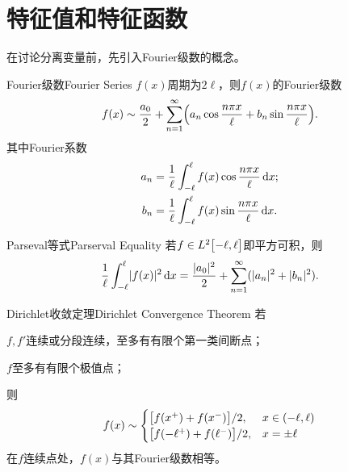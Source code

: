 \section{特征值和特征函数}
在讨论分离变量前，先引入Fourier级数的概念。
\begin{definition}{Fourier级数}{Fourier Series}
	$f(x)$周期为$2\ell$，则$f(x)$的Fourier级数
	\begin{align}
		f(x) \sim \frac{a_0}2 + \sum_{n=1}^\infty\Bigl(a_n\cos\frac{n\pi x}\ell + b_n\sin\frac{n\pi x}\ell\Bigr).
	\end{align}
	其中Fourier系数
	\begin{subequations}
		\label{eq:mmp-fourier-coefficients}
		\begin{align}
			a_n & = \frac1\ell\int_{-\ell}^\ell f(x)\cos\frac{n\pi x}\ell\mathop{}\!\mathrm{d} x; \\
			b_n & = \frac1\ell\int_{-\ell}^\ell f(x)\sin\frac{n\pi x}\ell\mathop{}\!\mathrm{d} x.
		\end{align}
	\end{subequations}
\end{definition}
\begin{theorem}{Parseval等式}{Parserval Equality}
	若$f \in L^2\bigl[-\ell,\ell\bigr]$即平方可积，则
	\begin{equation}
		\label{eq:mmp-trigonometric-parseval}
		\frac1\ell\int_{-\ell}^\ell \lvert f(x)\rvert^2\mathop{}\!\mathrm{d} x = \frac{\lvert a_0\rvert^2}2 + \sum_{n=1}^\infty(\lvert a_n\rvert^2 + \lvert b_n\rvert^2).
	\end{equation}
\end{theorem}
\begin{theorem}{Dirichlet收敛定理}{Dirichlet Convergence Theorem}
	若
	\begin{compactenum}
		\item $f,f'$连续或分段连续，至多有有限个第一类间断点；%
		\item $f$至多有有限个极值点；
	\end{compactenum}
	则
	\begin{equation}
		\label{eq:mmp-fourier-midpoint-convergence}
		f(x)
		\sim \begin{cases}
			\bigl[f(x^+) + f(x^-)\bigr]/2,        & x \in (-\ell,\ell) \\
			\bigl[f(-\ell^+) + f(\ell^-)\bigr]/2, & x = \pm\ell
		\end{cases}
	\end{equation}
	在$f$连续点处，$f(x)$与其Fourier级数相等。
\end{theorem}
